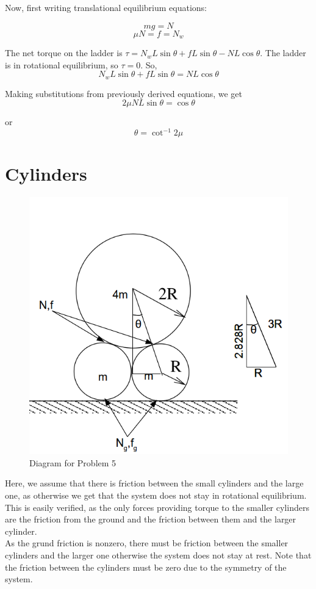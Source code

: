 \documentclass[12pt]{article}
\begin{document}
Now, first writing translational equilibrium equations:

$$mg=N$$
$$\mu N=f = N_w$$

The net torque on the ladder is $\tau=N_wL\sin\theta+fL\sin\theta - NL\cos\theta$. The ladder is in rotational equilibrium, so $\tau=0$. So, $$N_w L\sin\theta +fL\sin\theta =NL\cos\theta$$

Making substitutions from previously derived equations, we get $$2\mu NL\sin\theta=\cos\theta$$

or $$\boxed{\theta=\cot^{-1}2\mu}$$

\section{Cylinders}

\begin{figure}[h]
\centering
\includegraphics[scale=0.4]{5D}
\caption{Diagram for Problem 5}

\label{fig:5d}
\end{figure}
 


Here, we assume that there is friction between the small cylinders and the large one, as otherwise we get that the system does not stay in rotational equilibrium. This is easily verified, as the only forces providing torque to the smaller cylinders are the friction from the ground and the friction between them and the larger cylinder.\\  As the grund friction is nonzero, there must be friction between the smaller cylinders and the larger one otherwise the system does not stay at rest. Note that the friction between the cylinders must be zero due to the symmetry of the system.\\
\end{document}
